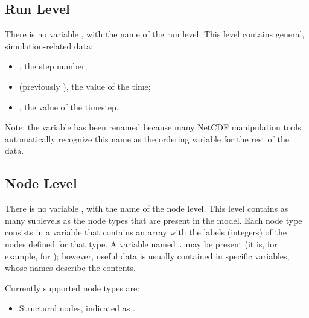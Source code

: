 \subsection{Run Level}
There is no variable , with the name of the run level.
This level contains general, simulation-related data:
\begin{itemize}
\item {}, the step number;
\item {} (previously ), the value of the time;
\item {}, the value of the timestep.
\end{itemize}
Note: the  variable has been renamed 
because many NetCDF manipulation tools automatically recognize
this name as the ordering variable for the rest of the data.



\subsection{Node Level}
There is no variable , with the name of the node level.
This level contains as many sublevels as the node types
that are present in the model.
Each node type consists in a variable that contains an array
with the labels (integers) of the nodes defined for that type.
A variable named \texttt{.} may be present
(it is, for example, for ); however, useful data is usually
contained in specific variables, whose names describe the contents.

Currently supported node types are:
\begin{itemize}
\item Structural nodes, indicated as .
\end{itemize}



